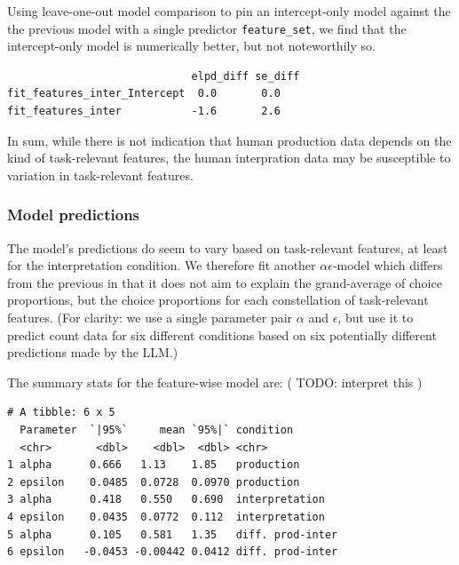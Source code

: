 \documentclass{article}
\begin{document}
Using leave-one-out model comparison to pin an intercept-only model
against the the previous model with a single predictor
\texttt{feature\_set}, we find that the intercept-only model is
numerically better, but not noteworthily so.

\begin{verbatim}
                             elpd_diff se_diff
fit_features_inter_Intercept  0.0       0.0
fit_features_inter           -1.6       2.6
\end{verbatim}

In sum, while there is not indication that human production data depends
on the kind of task-relevant features, the human interpration data may
be susceptible to variation in task-relevant features.

\hypertarget{model-predictions}{%
\subsubsection{Model predictions}\label{model-predictions}}

The model's predictions do seem to vary based on task-relevant features,
at least for the interpretation condition. We therefore fit another
\(\alpha\epsilon\)-model which differs from the previous in that it does
not aim to explain the grand-average of choice proportions, but the
choice proportions for each constellation of task-relevant features.
(For clarity: we use a single parameter pair \(\alpha\) and
\(\epsilon\), but use it to predict count data for six different
conditions based on six potentially different predictions made by the
LLM.) 

The summary stats for the feature-wise model are: ( { TODO: interpret
this })

\begin{verbatim}
# A tibble: 6 x 5
  Parameter  `|95%`     mean `95%|` condition
  <chr>       <dbl>    <dbl>  <dbl> <chr>
1 alpha      0.666   1.13    1.85   production
2 epsilon    0.0485  0.0728  0.0970 production
3 alpha      0.418   0.550   0.690  interpretation
4 epsilon    0.0435  0.0772  0.112  interpretation
5 alpha      0.105   0.581   1.35   diff. prod-inter
6 epsilon   -0.0453 -0.00442 0.0412 diff. prod-inter
\end{verbatim}
\end{document}
